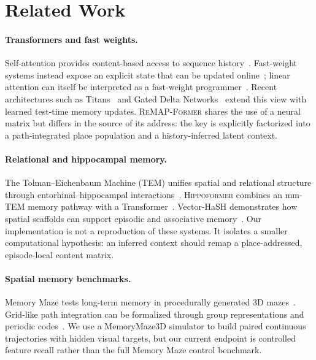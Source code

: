 \documentclass{article}
\newcommand{\model}{\textsc{ReMAP-Former}}
\newcommand{\hippo}{\textsc{Hippoformer}}
\begin{document}
\section{Related Work}

\paragraph{Transformers and fast weights.}
Self-attention provides content-based access to sequence history~\citep{vaswani2017attention}.
Fast-weight systems instead expose an explicit state that can be updated online~\citep{ba2016fastweights}; linear attention can itself be interpreted as a fast-weight programmer~\citep{schlag2021linear}.
Recent architectures such as Titans~\citep{behrouz2024titans} and Gated Delta Networks~\citep{yang2024gateddelta} extend this view with learned test-time memory updates.
\model{} shares the use of a neural matrix but differs in the source of its address: the key is explicitly factorized into a path-integrated place population and a history-inferred latent context.

\paragraph{Relational and hippocampal memory.}
The Tolman--Eichenbaum Machine (TEM) unifies spatial and relational structure through entorhinal--hippocampal interactions~\citep{whittington2020tem}.
\hippo{} combines an mm-TEM memory pathway with a Transformer~\citep{li2026hippoformer}.
Vector-HaSH demonstrates how spatial scaffolds can support episodic and associative memory~\citep{chandra2025vectorhash}.
Our implementation is not a reproduction of these systems.
It isolates a smaller computational hypothesis: an inferred context should remap a place-addressed, episode-local content matrix.

\paragraph{Spatial memory benchmarks.}
Memory Maze tests long-term memory in procedurally generated 3D mazes~\citep{pasukonis2023memorymaze}.
Grid-like path integration can be formalized through group representations and periodic codes~\citep{gao2021path}.
We use a MemoryMaze3D simulator to build paired continuous trajectories with hidden visual targets, but our current endpoint is controlled feature recall rather than the full Memory Maze control benchmark.
\end{document}
